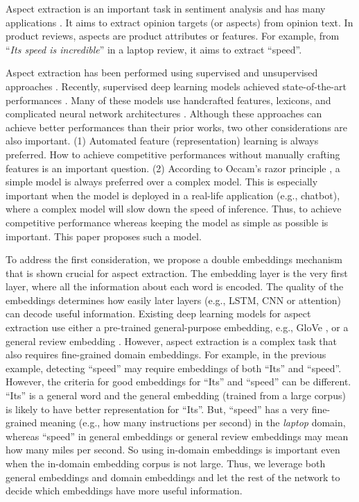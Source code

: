 Aspect extraction is an important task in sentiment analysis \cite{HuL2004} and has many applications \cite{Liu2012}.
It aims to extract opinion targets (or aspects) from opinion text. 
In product reviews, aspects are product attributes or features. 
For example, from ``\textit{Its speed is incredible}'' in a laptop review, it aims to extract ``speed''. 

Aspect extraction has been performed using supervised \cite{Jakob2010,chernyshevich2014ihs,shu2017lifelong} and unsupervised approaches \cite{HuL2004,ZhuangJZ2006,MeiLWSZ2007,QiuLBC2011,yin2016unsupervised,he2017unsupervised}. 
Recently, supervised deep learning models achieved state-of-the-art performances \cite{li2017deep}. Many of these models use handcrafted features, lexicons, and complicated neural network architectures \cite{poria2016aspect,wang2016recursive,wang2017coupled,li2017deep}. 
Although these approaches can achieve better performances than their prior works, two other considerations are also important.
(1) Automated feature (representation) learning is always preferred. 
How to achieve competitive performances without manually crafting features is an important question. 
(2) According to Occam's razor principle \cite{blumer1987occam}, a simple model is always preferred over a complex model.
This is especially important when the model is deployed in a real-life application (e.g., chatbot), where a complex model will slow down the speed of inference. Thus, to achieve competitive performance whereas keeping the model as simple as possible is important. This paper proposes such a model. 

To address the first consideration, we propose a double embeddings mechanism that is shown crucial for aspect extraction.
The embedding layer is the very first layer, where all the information about each word is encoded.
The quality of the embeddings determines how easily later layers (e.g., LSTM, CNN or attention) can decode useful information.
Existing deep learning models for aspect extraction use either a pre-trained general-purpose embedding, e.g., GloVe \cite{pennington2014glove}, or a general review embedding \cite{poria2016aspect}.
However, aspect extraction is a complex task that also requires fine-grained domain embeddings.
For example, in the previous example, detecting ``speed'' may require embeddings of both ``Its'' and ``speed''.
However, the criteria for good embeddings for ``Its'' and ``speed'' can be different.
``Its'' is a general word and the general embedding (trained from a large corpus) is likely to have better representation for ``Its''.
But, ``speed'' has a very fine-grained meaning (e.g., how many instructions per second) in the \textit{laptop} domain, whereas ``speed'' in general embeddings or general review embeddings may mean how many miles per second.
So using in-domain embeddings is important even when the in-domain embedding corpus is not large. 
Thus, we leverage both general embeddings and domain embeddings and let the rest of the network to decide which embeddings have more useful information.

